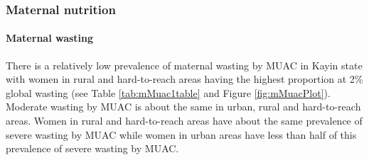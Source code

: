 \documentclass[12pt,a4paper]{article}
\let\oldparagraph\paragraph
\renewcommand{\paragraph}[1]{\oldparagraph{#1}\mbox{}}
\begin{document}
\newpage

\hypertarget{mnutrition}{%
\subsubsection{Maternal nutrition}\label{mnutrition}}

\hypertarget{mwasting}{%
\paragraph{Maternal wasting}\label{mwasting}}

There is a relatively low prevalence of maternal wasting by MUAC in Kayin state with women in rural and hard-to-reach areas having the highest proportion at 2\% global wasting (see Table \ref{tab:mMuac1table} and Figure \ref{fig:mMuacPlot}). Moderate wasting by MUAC is about the same in urban, rural and hard-to-reach areas. Women in rural and hard-to-reach areas have about the same prevalence of severe wasting by MUAC while women in urban areas have less than half of this prevalence of severe wasting by MUAC.
\end{document}

